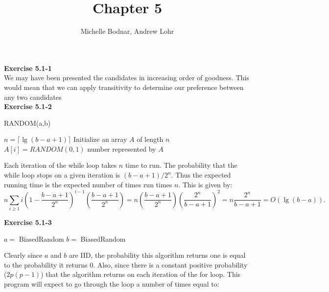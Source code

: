 \documentclass{article}
\title{Chapter 5}
\author{Michelle Bodnar, Andrew Lohr}
\begin{document}
\maketitle

\noindent\textbf{Exercise 5.1-1}\\

We may have been presented the candidates in increasing order of goodness. This would mean that we can apply transitivity to determine our preference between any two candidates\\

\noindent\textbf{Exercise 5.1-2}\\

\begin{algorithm}
\caption{RANDOM(a,b)}
\begin{algorithmic}[1]
\State $n = \lceil \lg(b-a+1) \rceil$
\State Initialize an array $A$ of length $n$
		\State $A[i] = RANDOM(0,1)$
	\EndFor
		\State \Return number represented by $A$
	\EndIf
\EndWhile
\end{algorithmic}
\end{algorithm}

Each iteration of the while loop takes $n$ time to run. The probability that the while loop stops on a given iteration is $(b-a+1) / 2^n$.  Thus the expected running time is the expected number of times run times $n$.  This is given by:
\[ n\sum_{i \geq 1}  i\left(1-\frac{b-a+1}{2^n}\right)^{i-1}\left(\frac{b-a+1}{2^n}\right) = n\left(\frac{b-a+1}{2^n}\right) \left(\frac{2^n}{b-a+1}\right)^2 = n\frac{2^n}{b-a+1} = O(\lg(b-a)).\]

\noindent\textbf{Exercise 5.1-3}\\

\begin{algorithm}
\begin{algorithmic}[1]
\State $a =$ BiasedRandom
\State $b =$ BiasedRandom
\State {}
\EndIf
{}
\State {}
\EndIf
\EndFor
\end{algorithmic}
\end{algorithm}
Clearly since $a$ and $b$ are IID, the probability this algorithm returns one is equal to the probability it returns 0. Also, since there is a constant positive probability ($2 p(p-1)$) that the algorithm returns on each iteration of the for loop. This program will expect to go through the loop a number of times equal to:
\end{document}
